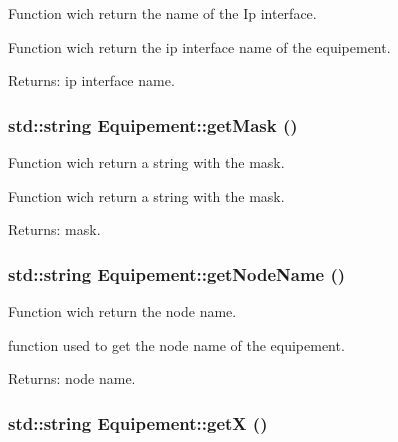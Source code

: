 Function wich return the name of the Ip interface. 

Function wich return the ip interface name of the equipement.

\begin{Desc}
\item[Returns:]ip interface name. \end{Desc}
\hypertarget{class_equipement_fd9a9ce18e78c3540a0cb6d633def3d3}{
\subsubsection[{getMask}]{\setlength{\rightskip}{0pt plus 5cm}std::string Equipement::getMask ()}}
\label{class_equipement_fd9a9ce18e78c3540a0cb6d633def3d3}


Function wich return a string with the mask. 

Function wich return a string with the mask.

\begin{Desc}
\item[Returns:]mask. \end{Desc}
\hypertarget{class_equipement_4ab70e59e11de8b7f8af99d06409b032}{
\subsubsection[{getNodeName}]{\setlength{\rightskip}{0pt plus 5cm}std::string Equipement::getNodeName ()}}
\label{class_equipement_4ab70e59e11de8b7f8af99d06409b032}


Function wich return the node name. 

function used to get the node name of the equipement.

\begin{Desc}
\item[Returns:]node name. \end{Desc}
\hypertarget{class_equipement_a5f9ea9a69609f65b8c64cda70446b02}{
\subsubsection[{getX}]{\setlength{\rightskip}{0pt plus 5cm}std::string Equipement::getX ()}}
\label{class_equipement_a5f9ea9a69609f65b8c64cda70446b02}



